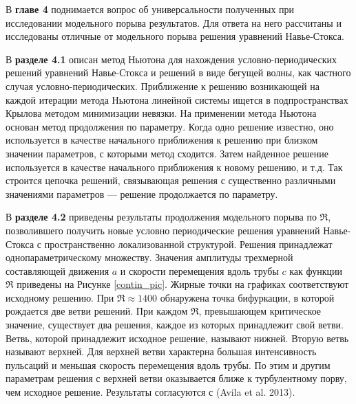 В \textbf{главе 4} поднимается вопрос об универсальности полученных при исследовании модельного порыва результатов. Для ответа на него рассчитаны и исследованы отличные от модельного порыва решения уравнений Навье-Стокса. 

В \textbf{разделе 4.1} описан метод Ньютона для нахождения условно-периодических решений уравнений Навье-Стокса и решений в виде бегущей волны, как частного случая условно-периодических. Приближение к решению возникающей на каждой итерации метода Ньютона линейной системы ищется в подпространствах Крылова методом минимизации невязки. 
На применении метода Ньютона основан метод продолжения по параметру. Когда одно решение известно, оно используется в качестве начального приближения к решению при близком значении параметров, с которыми метод сходится. Затем найденное решение используется в качестве начального приближения к новому решению, и т.д. Так строится цепочка решений, связывающая решения с существенно различными значениями параметров --- решение продолжается по параметру.


В \textbf{разделе 4.2} приведены результаты продолжения модельного порыва по $\Re$, позволившего получить новые условно периодические решения уравнений Навье-Стокса с пространственно локализованной структурой. Решения принадлежат однопараметрическому множеству. Значения амплитуды трехмерной составляющей движения $a$ и скорости перемещения вдоль трубы $c$ как функции $\Re$ приведены на Рисунке \ref{contin_pic}. Жирные точки на графиках соответствуют исходному решению. При $\Re \approx 1400$ обнаружена точка бифуркации, в которой рождается две ветви решений. При каждом $\Re$, превышающем критическое значение, существует два решения, каждое из которых принадлежит свой ветви. 
Ветвь, которой принадлежит исходное решение, называют нижней. Вторую ветвь называют верхней. Для верхней ветви характерна большая интенсивность пульсаций и меньшая скорость перемещения вдоль трубы. По этим и другим параметрам решения с верхней ветви оказывается ближе к турбулентному порву, чем исходное решение. Результаты согласуются с (Avila et al. 2013). 


